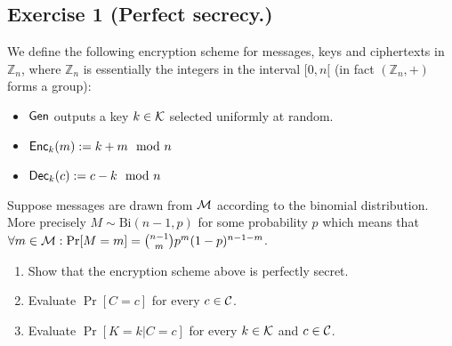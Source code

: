 \section{}
\subsection{Exercise 1 (Perfect secrecy.)}
We define the following encryption scheme for messages, keys and
ciphertexts in $\mathbb{Z}_n$, where $\mathbb{Z}_n$ is essentially 
the integers in the interval $[0,n[$ 
(in fact $(\mathbb{Z}_n,+)$ forms a group):
\smallskip
\begin{itemize}
  \item $\operatorname{\mathsf{Gen}}$ outputs a key $k \in \mathcal{K}$ selected uniformly at random.
  \item $\operatorname{\mathsf{Enc}}_k(m) := k+m \mod n$
  \item $\operatorname{\mathsf{Dec}}_k(c) := c-k \mod n$
\end{itemize}
\smallskip
Suppose messages are drawn from $\mathcal{M}$ according to the binomial
distribution. More precisely $M\sim \mathrm{Bi}(n-1,p)$ for some probability $p$ 
which means that $\forall m\in \mathcal{M}: \Pr[M=m]=\binom{n-1}{m}p^{m}(1-p)^{n-1-m}$.
\smallskip
\begin{enumerate}
  \item Show that the encryption scheme above is perfectly secret.
  \item Evaluate $\Pr[C=c]$ for every $c \in \mathcal{C}$.
  \item Evaluate $\Pr[K=k|C=c]$ for every $k\in \mathcal{K}$ and $c\in \mathcal{C}$. 
\end{enumerate}


